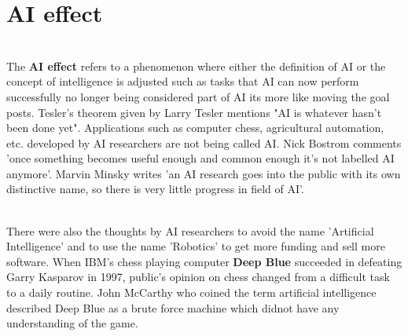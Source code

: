 \documentclass{article}
\begin{document}
\section{AI effect}
\begin{paragraph}
\\
The \textbf{AI effect} refers to a phenomenon where either the definition of AI or the concept of intelligence is adjusted such as tasks that AI can now perform successfully no longer being considered part of AI its more like moving the goal posts. Tesler's theorem given by Larry Tesler mentions "AI is whatever hasn't been done yet". Applications such as computer chess,  agricultural automation, etc. developed by AI researchers are not being called AI. Nick Bostrom comments 'once something becomes useful enough and common enough it's not labelled AI anymore'. Marvin Minsky writes 'an AI research goes into the public with its own distinctive name, so there is very little progress in field of AI'.
\end{paragraph}
\begin{paragraph}
\\
There were also the thoughts by AI researchers to avoid the name 'Artificial Intelligence' and to use the name 'Robotics' to get more funding and sell more software. When IBM's chess playing computer \textbf{Deep Blue} succeeded in defeating Garry Kasparov in 1997, public's opinion on chess changed from a difficult task to a daily routine. John McCarthy who coined the term artificial intelligence described Deep Blue as a brute force machine which didnot have any understanding of the game.
\end{paragraph}
\end{document}
